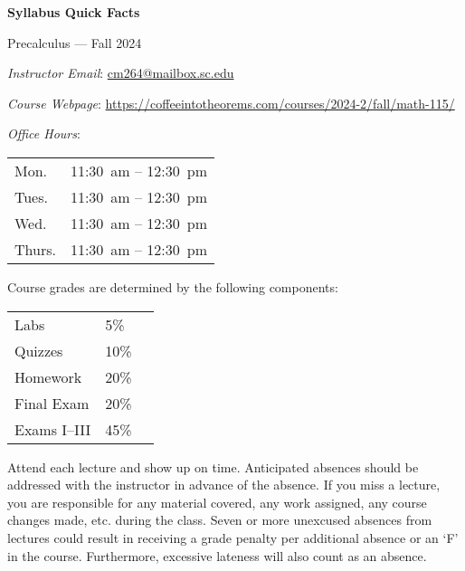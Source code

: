 \documentclass[11pt,letterpaper]{article}
\begin{document}
\begin{center} 
\bfseries
\color{scred}
\LARGE Syllabus Quick Facts \par\vspace{0.2\baselineskip}
\Large Precalculus --- Fall 2024
\end{center} \pspace


\hspace{0.53cm} {\itshape Instructor Email}: \href{mailto:cm264@mailbox.sc.edu}{cm264@mailbox.sc.edu} \par
\hspace{0.53cm} {\itshape Course Webpage}: \href{https://coffeeintotheorems.com/courses/2024-2/fall/math-115/}{https://coffeeintotheorems.com/courses/2024-2/fall/math-115/} \par
\hspace{0.53cm} {\itshape Office Hours}: 	\par \vspace{-0.3cm}
	\begin{table}[!ht]
	\centering
	\begin{tabular}{l || l}
	Mon. & 11:30~am -- 12:30~pm \\
	Tues. & 11:30~am -- 12:30~pm \\
	Wed. & 11:30~am -- 12:30~pm \\
	Thurs. & 11:30~am -- 12:30~pm
	\end{tabular}
	\end{table}


Course grades are determined by the following components: \par \vspace{-0.3cm}
	\begin{table}[!ht]
        \begin{tabular}{llr}
        Labs & 5\% \\
	Quizzes & 10\% \\
	Homework & 20\% \\
	Final Exam & 20\% \\
	Exams I--III & 45\% \\
        \end{tabular} 
        \end{table}


Attend each lecture and show up on time. Anticipated absences should be addressed with the instructor in advance of the absence. If you miss a lecture, you are responsible for any material covered, any work assigned, any course changes made, etc. during the class. Seven or more unexcused absences from lectures could result in receiving a grade penalty per additional absence or an `F' in the course. Furthermore, excessive lateness will also count as an absence. \pspace
\end{document}
